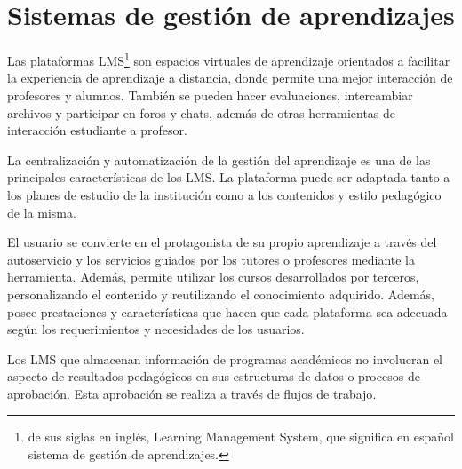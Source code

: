 \section{Sistemas de gestión de aprendizajes}
Las plataformas LMS\footnote{de sus siglas en inglés, Learning Management System, que significa en español sistema de gestión de aprendizajes.} son espacios virtuales de aprendizaje orientados a facilitar la experiencia de aprendizaje a distancia, donde permite una mejor interacción de profesores y alumnos. También se pueden hacer evaluaciones, intercambiar archivos y participar en foros y chats, además de otras herramientas de interacción estudiante a profesor.

La centralización y automatización de la gestión del aprendizaje es una de las principales características de los LMS. La plataforma puede ser adaptada tanto a los planes de estudio de la institución como a los contenidos y estilo pedagógico de la misma.

El usuario se convierte en el protagonista de su propio aprendizaje a través del autoservicio y los servicios guiados por los tutores o profesores mediante la herramienta. Además, permite utilizar los cursos desarrollados por terceros, personalizando el contenido y reutilizando el conocimiento adquirido. Además, posee prestaciones y características que hacen que cada plataforma sea adecuada según los requerimientos y necesidades de los usuarios.

Los LMS que almacenan información de programas académicos no involucran el aspecto de resultados pedagógicos en sus estructuras de datos o procesos de aprobación. Esta aprobación se realiza a través de flujos de trabajo\citep{aalst_workflow_2004}.